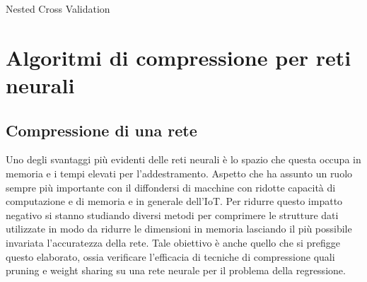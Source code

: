 \documentclass[12pt]{report}
\begin{document}
\makeatletter
\def\BState{\State\hskip-\ALG@thistlm}
\makeatother

\begin{algorithm}
\caption{Nested Cross Validation}
\end{algorithm}

\chapter{Algoritmi di compressione per reti neurali}

\section{Compressione di una rete}

Uno degli svantaggi più evidenti delle reti neurali è lo spazio che questa occupa in memoria e i tempi elevati per l’addestramento. Aspetto che ha assunto un ruolo sempre più importante con il diffondersi di macchine con ridotte capacità di computazione e di memoria e in generale dell’IoT. 
Per ridurre questo impatto negativo si stanno studiando diversi metodi per comprimere le strutture dati utilizzate in modo da ridurre le dimensioni in memoria lasciando il più possibile invariata l’accuratezza della rete. Tale obiettivo è anche quello che si prefigge questo elaborato, ossia verificare l’efficacia di tecniche di compressione quali pruning e weight sharing su una rete neurale per il problema della regressione. 
\end{document}
